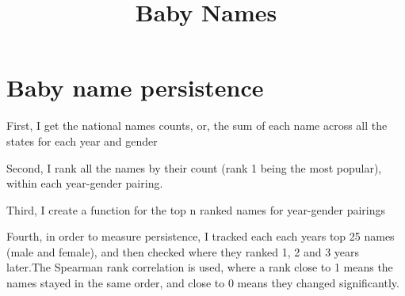 \documentclass[11pt,preprint]{elsarticle}
\numberwithin{equation}{section}
\numberwithin{figure}{section}
\numberwithin{table}{section}
\begin{document}
\begin{frontmatter}  %

\title{Baby Names}













\vspace{1cm}





\vspace{0.5cm}

\end{frontmatter}

\setcounter{footnote}{0}



\pagestyle{fancy}
\chead{}
\rhead{}
\lfoot{}
\lhead{}
\cfoot{}


\headsep 35pt %




\section{\texorpdfstring{Baby name persistence
\label{Baby name persistence }}{Baby name persistence }}\label{baby-name-persistence}

First, I get the national names counts, or, the sum of each name across
all the states for each year and gender

Second, I rank all the names by their count (rank 1 being the most
popular), within each year-gender pairing.

Third, I create a function for the top n ranked names for year-gender
pairings

Fourth, in order to measure persistence, I tracked each each years top
25 names (male and female), and then checked where they ranked 1, 2 and
3 years later.The Spearman rank correlation is used, where a rank close
to 1 means the names stayed in the same order, and close to 0 means they
changed significantly.
\end{document}
